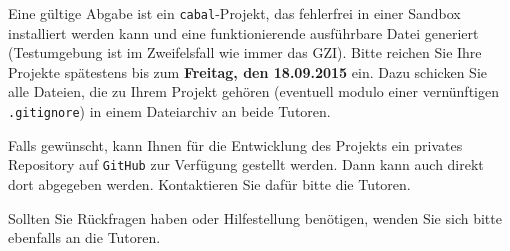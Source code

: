 \documentclass[10pt,a4paper]{article}
\begin{document}
Eine gültige Abgabe ist ein \texttt{cabal}-Projekt, das fehlerfrei in einer Sandbox installiert werden kann und eine funktionierende ausführbare Datei generiert (Testumgebung ist im Zweifelsfall wie immer das GZI). Bitte reichen Sie Ihre Projekte spätestens bis zum \textbf{Freitag, den 18.09.2015} ein.
Dazu schicken Sie alle Dateien, die zu Ihrem Projekt gehören (eventuell modulo einer vernünftigen \texttt{.gitignore}) in einem Dateiarchiv an beide Tutoren.\bigskip

Falls gewünscht, kann Ihnen für die Entwicklung des Projekts ein privates Repository auf \texttt{GitHub} zur Verfügung gestellt werden. Dann kann auch direkt dort abgegeben werden. Kontaktieren Sie dafür bitte die Tutoren.\bigskip

Sollten Sie Rückfragen haben oder Hilfestellung benötigen, wenden Sie sich bitte ebenfalls an die Tutoren.
\end{document}
